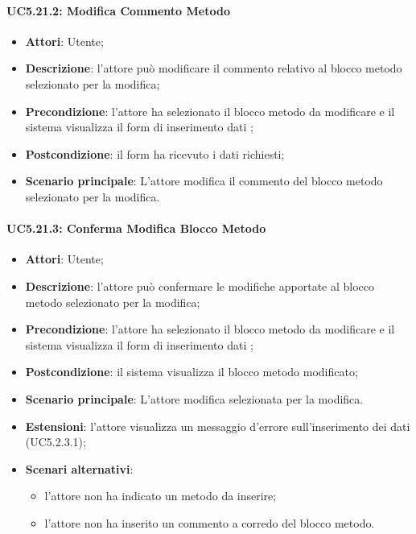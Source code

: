 \paragraph{UC5.21.2: Modifica Commento Metodo}
\label{UC5.21.2}
\begin{itemize}
\item \textbf{Attori}: Utente;
\item \textbf{Descrizione}: l'attore può modificare il commento relativo al blocco metodo selezionato per la modifica;
\item \textbf{Precondizione}: l'attore ha selezionato il blocco metodo da modificare e il sistema visualizza il form di inserimento dati ;	
\item \textbf{Postcondizione}: il form ha ricevuto i dati richiesti;	
\item \textbf{Scenario principale}:
L'attore modifica il commento del blocco metodo selezionato per la modifica.	
\end{itemize}
\paragraph{UC5.21.3: Conferma Modifica Blocco Metodo}
\label{UC5.21.3}
\begin{itemize}
\item \textbf{Attori}: Utente;
\item \textbf{Descrizione}: l'attore può confermare le modifiche apportate al blocco metodo selezionato per la modifica;
\item \textbf{Precondizione}: l'attore ha selezionato il blocco metodo da modificare e il sistema visualizza il form di inserimento dati ;	
\item \textbf{Postcondizione}: il sistema visualizza il blocco metodo modificato;	
\item \textbf{Scenario principale}:
L'attore modifica  selezionata per la modifica.
\item \textbf{Estensioni}:
l'attore visualizza un messaggio d'errore sull'inserimento dei dati (UC5.2.3.1);	
\item \textbf{Scenari alternativi}:
\begin{itemize}
\item l'attore non ha indicato un metodo da inserire;
\item l'attore non ha inserito un commento a corredo del blocco metodo.
\end{itemize}
\end{itemize}		
